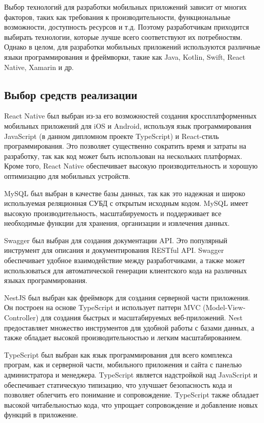 Выбор технологий для разработки мобильных приложений зависит от многих факторов,
таких как требования к производительности, функциональные возможности, доступность ресурсов и т.д.
Поэтому разработчикам приходится выбирать технологии, которые лучше всего соответствуют их потребностям.
Однако в целом, для разработки мобильных приложений используются различные языки программирования и фреймворки,
такие как Java, Kotlin, Swift, React Native, Xamarin и др.

\subsection{Выбор средств реализации}

React Native \cite{ReactNativeCliGuide} был выбран из-за его возможностей создания кроссплатформенных мобильных приложений для iOS и Android,
используя язык программирования JavaScript (в данном дипломном проекте TypeScript) и React-стиль программирования.
Это позволяет существенно сократить время и затраты на разработку, так как код может быть использован на нескольких платформах.
Кроме того, React Native обеспечивает высокую производительность и хорошую оптимизацию для мобильных устройств.

MySQL \cite{MySqlInNestJs} был выбран в качестве базы данных, так как это надежная и широко используемая реляционная СУБД с открытым исходным кодом.
MySQL имеет высокую производительность, масштабируемость и поддерживает все необходимые функции для хранения, организации и извлечения данных.

Swagger \cite{SwaggerInNestJs} был выбран для создания документации API.
Это популярный инструмент для описания и документирования RESTful API.
Swagger обеспечивает удобное взаимодействие между разработчиками,
а также может использоваться для автоматической генерации клиентского кода на различных языках программирования.

NestJS \cite{NestJsGuide} был выбран как фреймворк для создания серверной части приложения.
Он построен на основе TypeScript и использует паттерн MVC (Model-View-Controller) для создания быстрых и масштабируемых веб-приложений.
Nest предоставляет множество инструментов для удобной работы с базами данных, а также обладает высокой производительностью и легким масштабированием.

TypeScript \cite{TypeScriptGuide} был выбран как язык программирования для всего комплекса програм,
как и серверной части, мобильного приложения и сайта с панелью администратора и менеджера.
TypeScript является надстройкой над JavaScript и обеспечивает статическую типизацию, что улучшает безопасность кода и позволяет облегчить его понимание и сопровождение.
TypeScript также обладает высокой читабельностью кода, что упрощает сопровождение и добавление новых функций в приложение.

